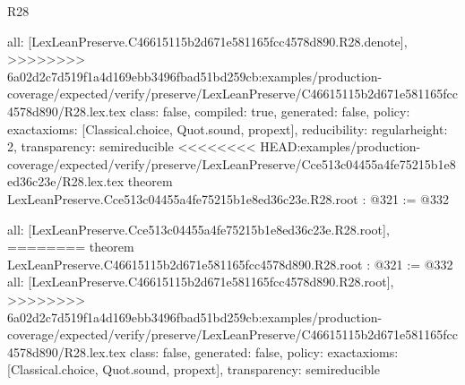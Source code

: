 \begin{lexlean}{R28}
\begin{coremodule}
{{{{{  all: [LexLeanPreserve.C46615115b2d671e581165fcc4578d890.R28.denote],
>>>>>>>> 6a02d2c7d519f1a4d169ebb3496fbad51bd259cb:examples/production-coverage/expected/verify/preserve/LexLeanPreserve/C46615115b2d671e581165fcc4578d890/R28.lex.tex
  class: false,
  compiled: true,
  generated: false,
  policy: exact{axioms: [Classical.choice, Quot.sound, propext]},
  reducibility: regular{height: 2},
  transparency: semireducible
}
<<<<<<<< HEAD:examples/production-coverage/expected/verify/preserve/LexLeanPreserve/Cce513c04455a4fe75215b1e8ed36c23e/R28.lex.tex
theorem LexLeanPreserve.Cce513c04455a4fe75215b1e8ed36c23e.R28.root : @321 := @332 {
  all: [LexLeanPreserve.Cce513c04455a4fe75215b1e8ed36c23e.R28.root],
========
theorem LexLeanPreserve.C46615115b2d671e581165fcc4578d890.R28.root : @321 := @332 {
  all: [LexLeanPreserve.C46615115b2d671e581165fcc4578d890.R28.root],
>>>>>>>> 6a02d2c7d519f1a4d169ebb3496fbad51bd259cb:examples/production-coverage/expected/verify/preserve/LexLeanPreserve/C46615115b2d671e581165fcc4578d890/R28.lex.tex
  class: false,
  generated: false,
  policy: exact{axioms: [Classical.choice, Quot.sound, propext]},
  transparency: semireducible
}

}}}}}
\end{coremodule}
\end{lexlean}
